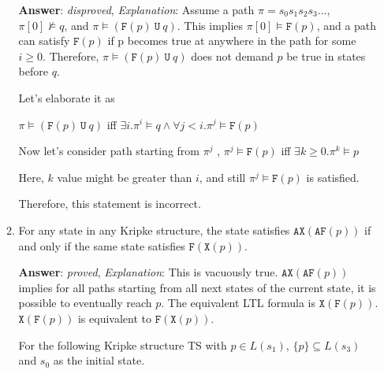 \documentclass[11pt]{article}
\newcommand{\ax}[1]{\texttt{AX}(#1)}
\newcommand{\af}[1]{\texttt{AF}(#1)}
\newcommand{\lx}[1]{\texttt{X}(#1)}
\newcommand{\lf}[1]{\texttt{F}(#1)}
\newcommand{\lu}[2]{(#1\ \texttt{U}\ #2)}
\begin{document}
\begin{enumerate}
\begin{enumerate}
    \textbf{Answer}: \textit{disproved}, \textit{Explanation}: Assume a path $\pi = s_0s_1s_2s_3...$, $\pi[0] \not \models q $, and $ \pi \models \lu{\lf{p}}{q}$. 
    This implies $\pi[0] \models \lf{p}$, and a path can satisfy $\lf{p}$ if p becomes true at anywhere in the path for some $i\geq 0$. Therefore,  $\pi \models \lu{\lf{p}}{q}$ does not demand $p$ be true in states before $q$. 

    Let's elaborate it as 

     $\pi \models \lu{\lf{p}}{q}$ iff $\exists i. \pi^i \models q \land \forall j < i. \pi^j \models \lf{p}$

     Now let's consider path starting from $\pi^j$ ,  $\pi^j \models \lf{p}$ iff $\exists k \geq 0. \pi^k \models p$   

    Here, $k$ value might be greater than $i$, and still $\pi^j \models \lf{p}$ is satisfied. 
    
   Therefore, this statement is incorrect.

    
    
\item For any state in any Kripke structure, the state satisfies
  $\ax{\af{p}}$ if and only if the same state satisfies $\lf{\lx{p}}$.

\textbf{Answer}: \textit{proved}, \textit{Explanation}: This is vacuously true. $\ax{\af{p}}$ implies for all paths starting from all next states of the current state, it is possible to eventually reach $p$. The equivalent LTL formula is $\lx{\lf{p}}$. $\lx{\lf{p}}$ is equivalent to  $\lf{\lx{p}}$.

For the following Kripke structure TS with $p\in L(s_1)$, $\{p\}\subseteq L(s_3)$ and $s_0$ as the initial state. 
        \begin{center}
\end{center}
\end{enumerate}
\end{enumerate}
\end{document}
